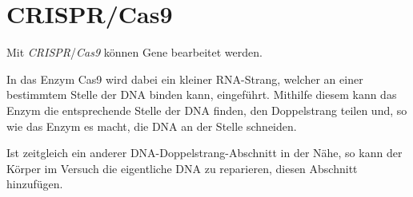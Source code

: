 \documentclass{article}
\begin{document}
\section{CRISPR/Cas9} 
Mit \emph{CRISPR}/\emph{Cas9} können Gene bearbeitet werden.

In das Enzym Cas9 wird dabei ein kleiner RNA-Strang, welcher an einer bestimmtem Stelle der DNA binden kann, eingeführt. Mithilfe diesem kann das Enzym die entsprechende Stelle der DNA finden, den Doppelstrang teilen und, so wie das Enzym es macht, die DNA an der Stelle schneiden.

Ist zeitgleich ein anderer DNA-Doppelstrang-Abschnitt in der Nähe, so kann der Körper im Versuch die eigentliche DNA zu reparieren, diesen Abschnitt hinzufügen.
\end{document}
